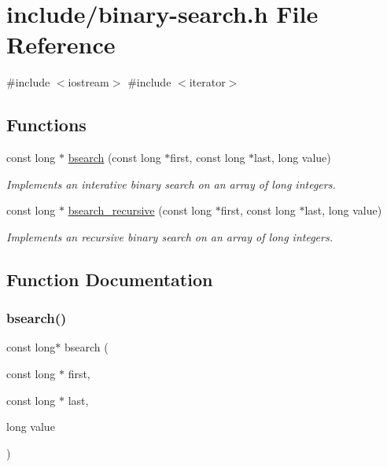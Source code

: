 \hypertarget{binary-search_8h}{}\section{include/binary-\/search.h File Reference}
\label{binary-search_8h}
{\ttfamily \#include $<$iostream$>$}\newline
{\ttfamily \#include $<$iterator$>$}\newline
\subsection*{Functions}
\begin{DoxyCompactItemize}
\item 
const long $\ast$ \mbox{\hyperlink{binary-search_8h_a20826c3f30778820b4c09cc75c30bfab}{bsearch}} (const long $\ast$first, const long $\ast$last, long value)
\begin{DoxyCompactList}\small\item\em Implements an interative binary search on an array of long integers. \end{DoxyCompactList}\item 
const long $\ast$ \mbox{\hyperlink{binary-search_8h_a9d68880223de2f3819bffee36f8486a5}{bsearch\+\_\+recursive}} (const long $\ast$first, const long $\ast$last, long value)
\begin{DoxyCompactList}\small\item\em Implements an recursive binary search on an array of long integers. \end{DoxyCompactList}\end{DoxyCompactItemize}


\subsection{Function Documentation}
\mbox{\label{binary-search_8h_a20826c3f30778820b4c09cc75c30bfab}} 
\subsubsection{\texorpdfstring{bsearch()}{bsearch()}}
{\footnotesize\ttfamily const long$\ast$ bsearch (\begin{DoxyParamCaption}\item[{const long $\ast$}]{first,  }\item[{const long $\ast$}]{last,  }\item[{long}]{value }\end{DoxyParamCaption})}



